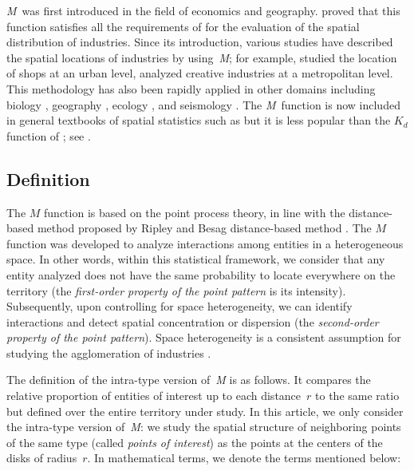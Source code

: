 \documentclass[fleqn,10pt]{latex/stylish_article} %
\begin{document}
\emph{M}~was first introduced in the field of economics and geography.
\citet{Marcon2010} proved that this function satisfies all the requirements of \citet{Duranton2005} for the evaluation of the spatial distribution of industries.
Since its introduction, various studies have described the spatial locations of industries by using~\emph{M}; for example, \citet{Jensen2011} studied the location of shops at an urban level, \citet{Coll-Martinez2019} analyzed creative industries at a metropolitan level.
This methodology has also been rapidly applied in other domains including biology \citep{Fernandez-Gonzalez2005}, geography \citep{Deurloo2008}, ecology \citep{Marcon2012}, and seismology \citep{Nissi2013}.
The \emph{M}~function is now included in general textbooks of spatial statistics such as \citet{Arbia2021} but it is less popular than the \(K_d\) function of \citet{Duranton2005}; see \citet{Chain2019}.

\subsection{Definition}\label{definition}

The \(M\) function is based on the point process theory, in line with the distance-based method proposed by Ripley and Besag distance-based method \citep{Ripley1976, Ripley1977, Besag1977}.
The \(M\) function was developed to analyze interactions among entities in a heterogeneous space.
In other words, within this statistical framework, we consider that any entity analyzed does not have the same probability to locate everywhere on the territory (the \emph{first-order property of the point pattern} is its intensity).
Subsequently, upon controlling for space heterogeneity, we can identify interactions and detect spatial concentration or dispersion (the \emph{second-order property of the point pattern}).
Space heterogeneity is a consistent assumption for studying the agglomeration of industries \citep[refer to the discussion of][ on that subject]{Duranton2005}.

The definition of the intra-type version of~\emph{M} is as follows.
It compares the relative proportion of entities of interest up to each distance~\(r\) to the same ratio but defined over the entire territory under study.
In this article, we only consider the intra-type version of~\emph{M}: we study the spatial structure of neighboring points of the same type (called \emph{points of interest}) as the points at the centers of the disks of radius~\(r\).
In mathematical terms, we denote the terms mentioned below:
\end{document}
